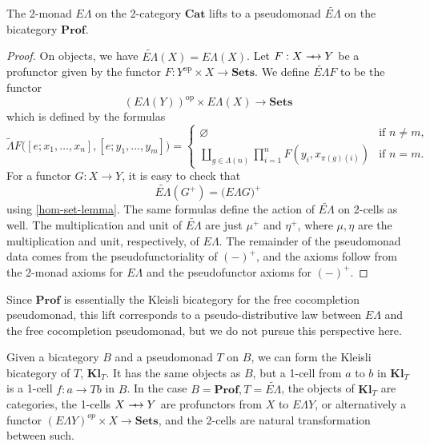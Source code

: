 \documentclass{amsbook} %
\newcommand{\mb}{\mathbf}
\def\srarrow{\relbar\joinrel\mapstochar\joinrel\rightarrow}
\numberwithin{section}{chapter}
\begin{document}
\begin{thm}
The 2-monad $E\Lambda$ on the 2-category $\mb{Cat}$ lifts to a pseudomonad $\widetilde{E\Lambda}$ on the bicategory $\mb{Prof}$.
\end{thm}
\begin{proof}
On objects, we have $\widetilde{E\Lambda}(X) = E\Lambda(X)$.  Let $F: X \srarrow Y$ be a profunctor given by the functor $F:Y^{\textrm{op}} \times X \rightarrow \mb{Sets}$.  We define $\widetilde{E\Lambda}F$ to be the functor
\[
( E\Lambda(Y) )^{\textrm{op}} \times E\Lambda(X) \rightarrow \mb{Sets}
\]
which is defined by the formulas
\[
\widetilde{\Lambda}F \big( [e; x_1, \ldots, x_n], [e; y_1, \ldots, y_m] \big) = \left\{
\begin{array}{lr}
\varnothing & \textrm{if $n \neq m$}, \\
\coprod_{g \in \Lambda(n)} \prod_{i=1}^{n} F(y_i, x_{\pi(g)(i)}) & \textrm{if $n = m$.}
\end{array}
\right.
\]
For a functor $G:X \to Y$, it is easy to check that
\[
\widetilde{E\Lambda}(G^{+}) = \big( E\Lambda G \big)^{+}
\]
using \ref{hom-set-lemma}.  The same formulas define the action of  $\widetilde{E\Lambda}$ on 2-cells as well.  The multiplication and unit of $\widetilde{E\Lambda}$ are just $\mu^{+}$ and $\eta^{+}$, where $\mu, \eta$ are the multiplication and unit, respectively, of $E\Lambda$.  The remainder of the pseudomonad data comes from the pseudofunctoriality of $(-)^{+}$, and the axioms follow from the 2-monad axioms for $E\Lambda$ and the pseudofunctor axioms for $(-)^{+}$.
\end{proof}

\begin{rem}
Since $\mb{Prof}$ is essentially the Kleisli bicategory for the free cocompletion pseudomonad, this lift corresponds to a pseudo-distributive law between $E\Lambda$ and the free cocompletion pseudomonad, but we do not pursue this perspective here.
\end{rem}

Given a bicategory $B$ and a pseudomonad $T$ on $B$, we can form the Kleisli bicategory of $T$, $\mb{Kl}_{T}$.  It has the same objects as $B$, but a 1-cell from $a$ to $b$ in  $\mb{Kl}_{T}$ is a 1-cell $f:a \rightarrow Tb$ in $B$.  In the case $B = \mb{Prof}, T = \widetilde{E\Lambda}$, the objects of $\mb{Kl}_{T}$ are categories, the 1-cells $X \srarrow Y$ are profunctors from $X$ to $E\Lambda Y$, or alternatively a functor $(E\Lambda Y)^{op} \times X \to \mb{Sets}$, and the 2-cells are natural transformation between such.
\end{document}

